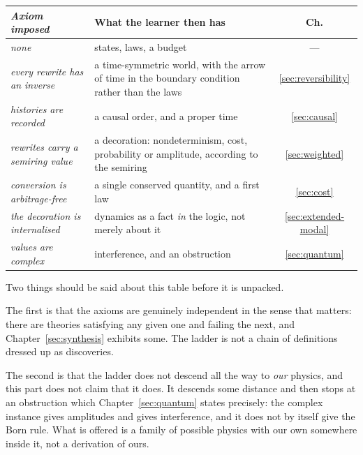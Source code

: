 \begin{center}
\renewcommand{\arraystretch}{1.3}
\begin{tabular}{>{\itshape}p{4.4cm} p{5.4cm} c}
\toprule
\normalfont\textbf{Axiom imposed} & \textbf{What the learner then has} & \textbf{Ch.} \\
\midrule
none
  & states, laws, a budget
  & --- \\
every rewrite has an inverse
  & a time-symmetric world, with the arrow of time in the boundary
    condition rather than the laws
  & \ref{sec:reversibility} \\
histories are recorded
  & a causal order, and a proper time
  & \ref{sec:causal} \\
rewrites carry a semiring value
  & a decoration: nondeterminism, cost, probability or amplitude,
    according to the semiring
  & \ref{sec:weighted} \\
conversion is arbitrage-free
  & a single conserved quantity, and a first law
  & \ref{sec:cost} \\
the decoration is internalised
  & dynamics as a fact \emph{in} the logic, not merely about it
  & \ref{sec:extended-modal} \\
values are complex
  & interference, and an obstruction
  & \ref{sec:quantum} \\
\bottomrule
\end{tabular}
\end{center}

Two things should be said about this table before it is unpacked.

The first is that the axioms are genuinely independent in the sense that
matters: there are theories satisfying any given one and failing the
next, and Chapter~\ref{sec:synthesis} exhibits some.
The ladder is not a chain of definitions dressed up as discoveries.

The second is that the ladder does not descend all the way to
\emph{our} physics, and this part does not claim that it does.
It descends some distance and then stops at an obstruction which
Chapter~\ref{sec:quantum} states precisely: the complex instance gives
amplitudes and gives interference, and it does not by itself give the
Born rule.
What is offered is a family of possible physics with our own somewhere
inside it, not a derivation of ours.

